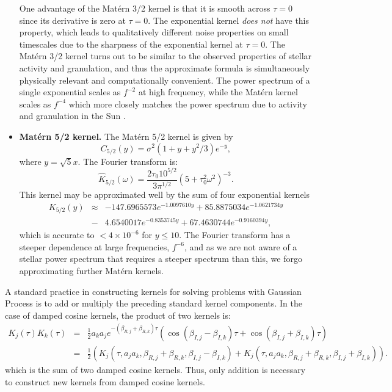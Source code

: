 \documentclass[manuscript, letterpaper]{aastex6}
\begin{document}
\begin{itemize}
One advantage of the Mat\'ern 3/2 kernel is that it is smooth across
$\tau=0$ since its derivative is zero at $\tau=0$.  The exponential kernel {\it does not}
have this property, which leads to qualitatively different noise properties on small
timescales due to the sharpness of the exponential kernel at $\tau=0$.  The Mat\'ern 3/2 kernel
turns out to be similar to the observed properties of stellar activity and granulation, and thus the approximate
formula is simultaneously physically relevant and computationally convenient.  
The power spectrum of a single exponential scales as $f^{-2}$ at high frequency,
while the Mat\'ern kernel scales as $f^{-4}$ which more closely matches the power
spectrum due to activity and granulation in the Sun \citep{2004A&A...414.1139A,2009A&A...495..979M}.
\item {\bf Mat\'ern 5/2 kernel.}  The Mat\'ern 5/2 kernel is given by
\begin{equation}
C_{5/2}(y) = \sigma^2 (1+y+y^2/3)e^{-y},
\end{equation}
where $y = \sqrt{5}x$.  The Fourier transform is:
\begin{equation}
\hat K_{5/2}(\omega) = \frac{2\tau_0 10^{5/2}}{3\pi^{1/2}} (5+\tau_0^2\omega^2)^{-3}.
\end{equation}
This kernel may be approximated well by the sum of four exponential kernels
\begin{eqnarray}
K_{5/2}(y) &\approx& -147.6965573 e^{-1.0097610 y} + 85.8875034 e^{-1.0621734 y}\\
 &-&4.6540017 e^{-0.8353745 y} + 67.4630744 e^{-0.9160394 y},
\end{eqnarray}
which is accurate to $<4\times 10^{-6}$ for $y \le 10$.
The Fourier transform has a steeper dependence at large frequencies, $f^{-6}$, and as we are not aware of a stellar
power spectrum that requires a steeper spectrum than this, we forgo approximating further Mat\'ern kernels.
\end{itemize}

A standard practice in constructing kernels for solving problems with Gaussian Process
is to add or multiply the preceding standard kernel components.  In the case of damped cosine
kernels, the product of two kernels is: 
\begin{eqnarray}
K_j(\tau)K_k(\tau) &=&
\frac{1}{2} a_k a_j e^{-(\beta_{R,j}+\beta_{R,k}) \tau} \left(\cos{(\beta_{I,j}-\beta_{I,k})\tau}+\cos{(\beta_{I,j}+\beta_{I,k})\tau}\right)\\
&=& \frac{1}{2} \left(K_j(\tau,a_ja_k,\beta_{R,j}+\beta_{R,k},\beta_{I,j}-\beta_{I,k}) +K_j(\tau,a_ja_k,\beta_{R,j}+\beta_{R,k},\beta_{I,j}+\beta_{I,k})\right).
\end{eqnarray}
which is the sum of two damped cosine kernels.  Thus, only addition is necessary to
construct new kernels from damped cosine kernels.
\end{document}
